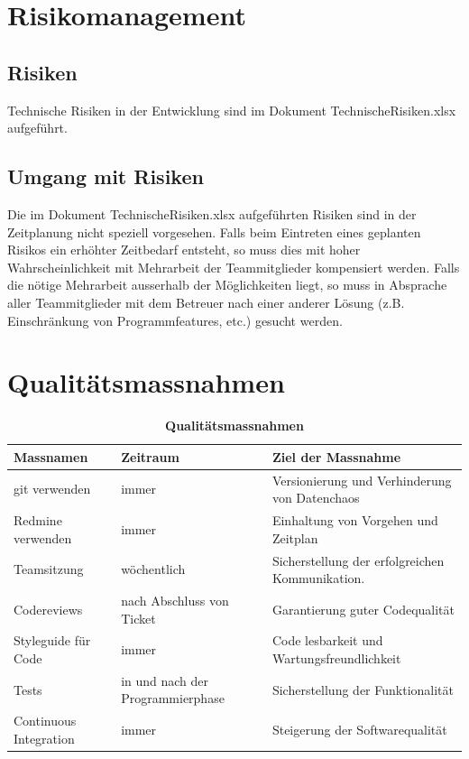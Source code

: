 \documentclass[a4,12pt]{scrartcl}
\begin{document}
\section{Risikomanagement}
\subsection{Risiken}
Technische Risiken in der Entwicklung sind im Dokument TechnischeRisiken.xlsx aufgeführt.
\subsection{Umgang mit Risiken}
Die im Dokument TechnischeRisiken.xlsx aufgeführten Risiken sind in der Zeitplanung nicht speziell vorgesehen. Falls beim Eintreten eines geplanten Risikos ein erhöhter Zeitbedarf entsteht, so muss dies mit hoher Wahrscheinlichkeit mit Mehrarbeit der Teammitglieder kompensiert werden. Falls die nötige Mehrarbeit ausserhalb der Möglichkeiten liegt, so muss in Absprache aller Teammitglieder mit dem Betreuer nach einer anderer Lösung (z.B. Einschränkung von Programmfeatures, etc.) gesucht werden.


\section{Qualitätsmassnahmen}

\begin{table}[H]
\centering
    \begin{tabular}{@{} p{3cm} p{4cm} p{6cm} @{}}\toprule    
    {Massnamen} & {Zeitraum} & {Ziel der Massnahme}\\ \midrule
    git verwenden & immer & Versionierung und Verhinderung von Datenchaos\\ \addlinespace
    Redmine verwenden & immer & Einhaltung von Vorgehen und Zeitplan\\ \addlinespace
    Teamsitzung & wöchentlich & Sicherstellung der erfolgreichen Kommunikation.\\ \addlinespace
    Codereviews & nach Abschluss von Ticket & Garantierung guter Codequalität  \\ \addlinespace
    Styleguide für Code & immer & Code lesbarkeit und Wartungsfreundlichkeit\\
\addlinespace
    Tests & in und nach der Programmierphase & Sicherstellung der Funktionalität \\
\addlinespace
    Continuous Integration & immer & Steigerung der Softwarequalität\\    
    \bottomrule
    \end{tabular}
\caption{\textbf{Qualitätsmassnahmen}}
\end{table}
\end{document}
